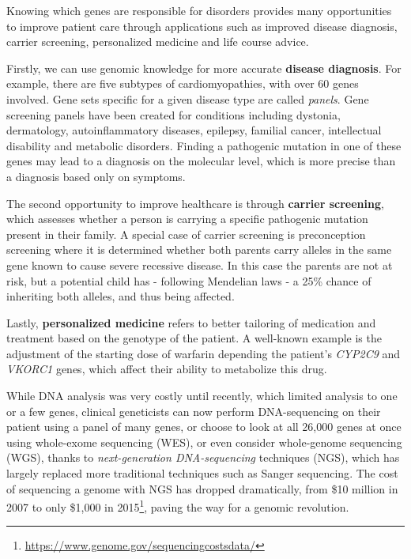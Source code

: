 Knowing which genes are responsible for disorders provides many opportunities to improve patient care through applications such as improved disease diagnosis, carrier screening, personalized medicine and life course advice.

Firstly, we can use genomic knowledge for more accurate \textbf{disease diagnosis}.
For example, there are five subtypes of cardiomyopathies, with over 60 genes involved\cite{Jongbloed_2010}. Gene sets specific for a given disease type are called \textsl{panels}.
Gene screening panels have been created for conditions including dystonia, dermatology, autoinflammatory diseases, epilepsy, familial cancer, intellectual disability and metabolic disorders.
Finding a pathogenic mutation in one of these genes may lead to a diagnosis on the molecular level, which is more precise than a diagnosis based only on symptoms.

The second opportunity to improve healthcare is through \textbf{carrier screening}, which assesses whether a person is carrying a specific patho\-gen\-ic mutation present in their family.
A special case of carrier screening is preconception screening where it is determined whether both parents carry alleles in the same gene known to cause severe recessive disease.
In this case the parents are not at risk, but a potential child has - following Mendelian laws - a 25\% chance of inheriting both alleles, and thus being affected.

Lastly, \textbf{personalized medicine} refers to better tailoring of medication and treatment based on the genotype of the patient.
A well-known example is the adjustment of the starting dose of warfarin depending the patient's \textsl{CYP2C9} and \textsl{VKORC1} genes\cite{Limdi_2008,Ventola_2011}, which affect their ability to metabolize this drug.

While DNA analysis was very costly until recently, which limited analysis to one or a few genes, clinical geneticists can now perform DNA-sequencing on their patient using a panel of many genes, or choose to look at all 26,000 genes at once using whole-exome sequencing (WES), or even consider whole-genome sequencing (WGS), thanks to \textsl{next-generation DNA-sequencing} techniques (NGS), which has largely replaced more traditional techniques such as Sanger sequencing\cite{Sanger_1977}.
The cost of sequencing a genome with NGS has dropped dramatically, from \$10 million in 2007 to only \$1,000 in 2015\footnote{\url{https://www.genome.gov/sequencingcostsdata/}}, paving the way for a genomic revolution.

